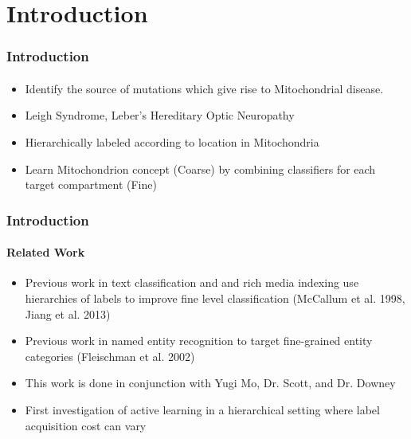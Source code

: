 \documentclass{beamer}
\begin{document}
\section{Introduction}
\begin{frame}
    \frametitle{Introduction}
    \framesubtitle{}
    \begin{itemize}
      \item Identify the source of mutations which give rise to Mitochondrial disease.
      \item Leigh Syndrome, Leber’s Hereditary Optic Neuropathy %
      \item Hierarchically labeled according to location in Mitochondria
      \item Learn Mitochondrion concept (Coarse) by combining classifiers for each target compartment (Fine)
    \end{itemize}
\end{frame}
\begin{frame}
    \frametitle{Introduction}
    \framesubtitle{Related Work}
    \begin{itemize}
      \item Previous work in text classification and and rich media indexing use hierarchies of
      labels to improve fine level classification (McCallum et al. 1998, Jiang et al. 2013)
      \item Previous work in named entity recognition to target fine-grained entity categories (Fleischman et al. 2002)
      \item This work is done in conjunction with Yugi Mo, Dr. Scott, and Dr. Downey
      \item First investigation of active learning in a hierarchical setting where label acquisition cost can vary
    \end{itemize}
\end{frame}
\end{document}
